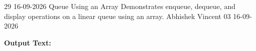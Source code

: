 \clearpage
\label{prog:29}
\programhead
  {29}
  {16-09-2026}
  {Queue Using an Array}
  {Demonstrates enqueue, dequeue, and display operations on a linear queue using an array.}
  {Abhishek Vincent}
  {03}
  {16-09-2026}

\divider
\textbf{Output Text:}\par
\vspace{2pt}


